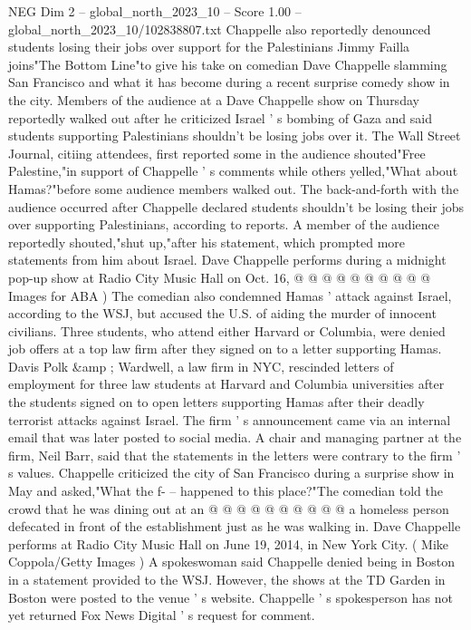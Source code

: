 \begin{textsample}{NEG Dim 2 – global\_north\_2023\_10 – Score 1.00 – global\_north\_2023\_10/102838807.txt}  \label{ex:f2_neg_294}
Chappelle also reportedly denounced students losing their jobs over support for the Palestinians Jimmy Failla joins"The Bottom Line"to give his take on comedian Dave Chappelle slamming San Francisco and what it has become during a recent surprise comedy show in the city.
Members of the audience at a Dave Chappelle show on Thursday reportedly walked out after he criticized Israel ' s bombing of Gaza and said students supporting Palestinians shouldn't be losing jobs over it.
The Wall Street Journal, citiing attendees, first reported some in the audience shouted"Free Palestine,"in support of Chappelle ' s comments while others yelled,"What about Hamas?"before some audience members walked out.
The back-and-forth with the audience occurred after Chappelle declared students shouldn't be losing their jobs over supporting Palestinians, according to reports.
A member of the audience reportedly shouted,"shut up,"after his statement, which prompted more statements from him about Israel.
Dave Chappelle performs during a midnight pop-up show at Radio City Music Hall on Oct. 16, @ @ @ @ @ @ @ @ @ @ Images for ABA ) The comedian also condemned Hamas ' attack against Israel, according to the WSJ, but accused the U.S. of aiding the murder of innocent civilians.
Three students, who attend either Harvard or Columbia, were denied job offers at a top law firm after they signed on to a letter supporting Hamas.
Davis Polk \&amp ; Wardwell, a law firm in NYC, rescinded letters of employment for three law students at Harvard and Columbia universities after the students signed on to open letters supporting Hamas after their deadly terrorist attacks against Israel.
The firm ' s announcement came via an internal email that was later posted to social media.
A chair and managing partner at the firm, Neil Barr, said that the statements in the letters were contrary to the firm ' s values.
Chappelle criticized the city of San Francisco during a surprise show in May and asked,"What the f- -- happened to this place?"The comedian told the crowd that he was dining out at an @ @ @ @ @ @ @ @ @ @ a homeless person defecated in front of the establishment just as he was walking in.
Dave Chappelle performs at Radio City Music Hall on June 19, 2014, in New York City. ( Mike Coppola/Getty Images ) A spokeswoman said Chappelle denied being in Boston in a statement provided to the WSJ.
However, the shows at the TD Garden in Boston were posted to the venue ' s website.
Chappelle ' s spokesperson has not yet returned Fox News Digital ' s request for comment.

\end{textsample}
